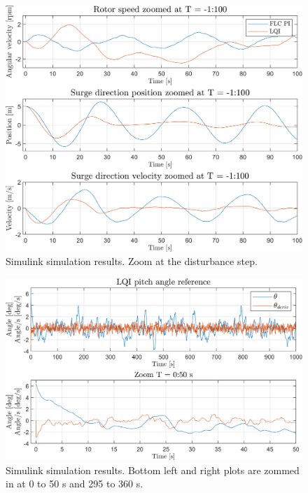 \begin{figure}[ht]
	\centering
	\includegraphics[width=0.7\linewidth]{Graphics/TestResults/linearModPerf/sim_12_W_py_vy_comp_zoom.png}
	\caption{Simulink simulation results. Zoom at the disturbance step.}
	\label{fig:sim_03_W_py_vy_comp_zoom}
\end{figure}

\begin{figure}[ht]
	\centering
	\includegraphics[width=0.7\linewidth]{Graphics/TestResults/linearModPerf/sim_10_pitch.png}
	\caption{Simulink simulation results. Bottom left and right plots are zommed in at 0 to 50 s and 295 to 360 s.}
	\label{fig:sim_01_pitch}
\end{figure}